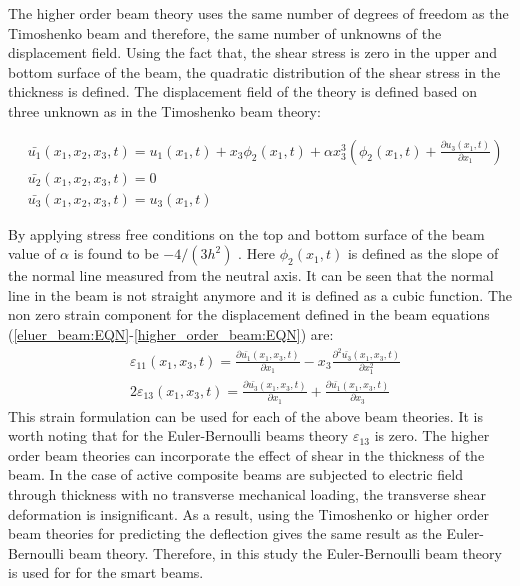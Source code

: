 The higher order beam theory uses the same number of degrees of freedom as the Timoshenko beam and therefore, the same number of unknowns of the displacement field.
Using the fact that, the shear stress is zero in the upper and bottom surface of the beam, the quadratic distribution of the shear stress in the thickness is defined.
The displacement field of the theory is defined based on three unknown as in the Timoshenko beam theory:

\begin{equation}
\begin{aligned}
& \bar {u_1} (x_1,x_2,x_3,t)=u_1 (x_1,t)+x_3  \phi_2(x_1,t) +\alpha x_3^3(\phi_2(x_1,t)+\frac{\partial u_3 (x_1,t)} {\partial x_1}) \\
& \bar {u_2} (x_1,x_2,x_3,t)=0 \\
& \bar {u_3} (x_1,x_2,x_3,t)=u_3 (x_1,t)
\end{aligned}
\label{higher_order_beam:EQN}
\end{equation}

By applying stress free conditions on the top and bottom surface of the beam value of $\alpha$ is found to be  $-4/(3h^2)$ \cite{Wang2000}.
Here $\phi_2(x_1,t)$ is defined as the slope of the normal line measured from the neutral axis.
It can be seen that the normal line in the beam is not straight anymore and it is defined as a cubic function.
The non zero strain component for the displacement defined in the beam equations (\ref{eluer_beam:EQN}-\ref{higher_order_beam:EQN}) are:
\begin{equation}
\begin{aligned}
& \varepsilon_{11} (x_1,x_3,t)=\frac{\partial    \bar {u_1} (x_1,x_3,t) } {\partial x_1} - x_3 \frac{\partial^2 \bar{ u_3} (x_1,x_3,t) } {\partial x_1^2} \\
& 2  \varepsilon_{13} (x_1,x_3,t)=\frac{\partial \bar {u_3} (x_1,x_3,t) } {\partial x_1} + \frac{\partial       \bar{ u_1} (x_1,x_3,t)} {\partial x_3}
\end{aligned}
\label{_strain_beam:EQN}
\end{equation}
This strain formulation can be used for each of the above beam theories.
It is worth noting that for the Euler-Bernoulli beams theory $\varepsilon_{13}$ is zero.
The higher order beam theories can incorporate the effect of shear in the thickness of the beam.
In the case of active composite beams are subjected to electric field through thickness with no transverse mechanical loading, the transverse shear deformation is insignificant.
As a result, using the Timoshenko or higher order beam theories for predicting the deflection gives the same result as the Euler-Bernoulli beam theory.
Therefore, in this study the Euler-Bernoulli beam theory is used for for the smart beams.



